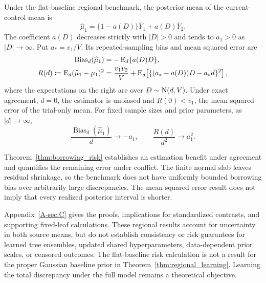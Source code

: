 \documentclass[11pt]{article}
\begin{document}
\begin{theorem}\label{thm:borrowing_risk}
Under the flat-baseline regional benchmark, the posterior mean of the current-control mean is
\begin{equation}\label{eq:regional_estimator}
\widehat\mu_1=\{1-a(D)\}\bar Y_1+a(D)\bar Y_2.
\end{equation}
The coefficient $a(D)$ decreases strictly with $|D|>0$ and tends to $a_1>0$ as $|D|\to\infty$. Put $a_*=v_1/V$. Its repeated-sampling bias and mean squared error are
\begin{equation}\label{eq:regional_risk}
\begin{aligned}
\operatorname{Bias}_d(\widehat\mu_1)&=-\operatorname{E}_d\{a(D)D\},\\
R(d)\coloneqq\operatorname{E}_d(\widehat\mu_1-\mu_1)^2
&=\frac{v_1v_2}{V}
+\operatorname{E}_d\!\left[\{(a_*-a(D))D-a_*d\}^2\right],
\end{aligned}
\end{equation}
where the expectations on the right are over $D\sim\mathrm{N}(d,V)$. Under exact agreement, $d=0$, the estimator is unbiased and $R(0)<v_1$, the mean squared error of the trial-only mean. For fixed sample sizes and prior parameters, as $|d|\to\infty$,
\[
\frac{\operatorname{Bias}_d(\widehat\mu_1)}{d}\longrightarrow-a_1,
\qquad \frac{R(d)}{d^2}\longrightarrow a_1^2.
\]
\end{theorem}
Theorem~\ref{thm:borrowing_risk} establishes an estimation benefit under agreement and quantifies the remaining error under conflict. The finite normal slab leaves residual shrinkage, so the benchmark does not have uniformly bounded borrowing bias over arbitrarily large discrepancies. The mean squared error result does not imply that every realized posterior interval is shorter.

Appendix~\ref{A-sec:C} gives the proofs, implications for standardized contrasts, and supporting fixed-leaf calculations. These regional results account for uncertainty in both source means, but do not establish consistency or risk guarantees for learned tree ensembles, updated shared hyperparameters, data-dependent prior scales, or censored outcomes. The flat-baseline risk calculation is not a result for the proper Gaussian baseline prior in Theorem~\ref{thm:regional_learning}. Learning the total discrepancy under the full model remains a theoretical objective.
\end{document}
